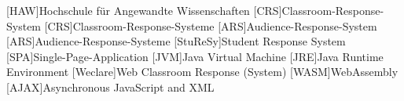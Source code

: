 \begin{acronym}[StuReSy]
    [HAW]{Hochschule für Angewandte Wissenschaften}
    [CRS]{Classroom-Response-System}
    [CRS]{Classroom-Response-Systeme}
    [ARS]{Audience-Response-System}
    [ARS]{Audience-Response-Systeme}
    [StuReSy]{Student Response System}
    [SPA]{Single-Page-Application}
    [JVM]{Java Virtual Machine}
    [JRE]{Java Runtime Environment}
    [Weclare]{Web Classroom Response (System)}
    [WASM]{WebAssembly}
    [AJAX]{Asynchronous JavaScript and XML}
\end{acronym}
